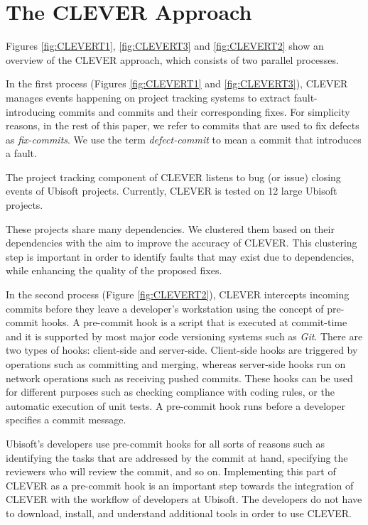 \documentclass[sigconf]{acmart}
\begin{document}
\section{The CLEVER Approach}\label{sec:CLEVERT}


Figures \ref{fig:CLEVERT1}, \ref{fig:CLEVERT3} and \ref{fig:CLEVERT2}
show an overview of the CLEVER approach, which consists of two parallel
processes.

In the first process (Figures \ref{fig:CLEVERT1} and
\ref{fig:CLEVERT3}), CLEVER manages events happening on project tracking
systems to extract fault-introducing commits and commits and their
corresponding fixes. For simplicity reasons, in the rest of this paper,
we refer to commits that are used to fix defects as \emph{fix-commits}.
We use the term \emph{defect-commit} to mean a commit that introduces a
fault.

The project tracking component of CLEVER listens to bug (or issue)
closing events of Ubisoft projects. Currently, CLEVER is tested on 12
large Ubisoft projects. 






These projects share many dependencies. We
clustered them based on their dependencies with the aim to improve the
accuracy of CLEVER. This clustering step is important in order to
identify faults that may exist due to dependencies, while enhancing the
quality of the proposed fixes.


In the second process (Figure \ref{fig:CLEVERT2}), CLEVER intercepts
incoming commits before they leave a developer's workstation using the
concept of pre-commit hooks. A pre-commit hook is a script that is
executed at commit-time and it is supported by most major code
versioning systems such as \emph{Git}. There are two types of hooks:
client-side and server-side. Client-side hooks are triggered by
operations such as committing and merging, whereas server-side hooks run
on network operations such as receiving pushed commits. These hooks can
be used for different purposes such as checking compliance with coding
rules, or the automatic execution of unit tests. A pre-commit hook runs
before a developer specifies a commit message.

Ubisoft's developers use pre-commit hooks for all sorts of reasons such
as identifying the tasks that are addressed by the commit at hand,
specifying the reviewers who will review the commit, and so on.
Implementing this part of CLEVER as a pre-commit hook is an important
step towards the integration of CLEVER with the workflow of developers
at Ubisoft. The developers do not have to download, install, and
understand additional tools in order to use CLEVER.
\end{document}
